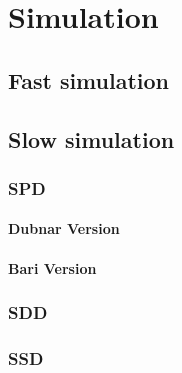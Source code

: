 \chapter{Simulation}

\section{Fast simulation}

\section{Slow simulation}

\subsection{SPD}

\subsubsection{Dubnar Version}

\subsubsection{Bari Version}

\subsection{SDD}

\subsection{SSD}


